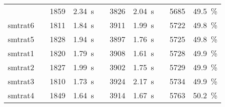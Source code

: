 \begin{table}[]
\begin{tabularx}{\textwidth}{lXrrXrrXrr}
    	&& 1859 & 2.34~s
    	&& 3826 & 2.04~s
    	&& 5685 & 49.5~\%
    	\\
    	\rowcolor{green!20}
    	smtrat6
    	&& 1811 & 1.84~s
    	&& 3911 & 1.99~s
    	&& 5722 & 49.8~\%
    	\\
    	\rowcolor{green!20}
    	smtrat5
    	&& 1828 & 1.94~s
    	&& 3897 & 1.76~s
    	&& 5725 & 49.8~\%
    	\\
    	\rowcolor{green!20}
    	smtrat1
    	&& 1820 & 1.79~s
    	&& 3908 & 1.61~s
    	&& 5728 & 49.9~\%
    	\\
     	\rowcolor{green!20}
    	smtrat2
    	&& 1827 & 1.99~s
    	&& 3902 & 1.75~s
    	&& 5729 & 49.9~\%
    	\\
    	\rowcolor{green!20}
    	smtrat3
    	&& 1810 & 1.73~s
    	&& 3924 & 2.17~s
    	&& 5734 & 49.9~\%
    	\\
     	\rowcolor{green!20}
    	smtrat4
    	&& 1849 & 1.64~s
    	&& 3914 & 1.67~s
    	&& 5763 & 50.2~\%
    	\\
    	\bottomrule
    \end{tabularx}
    \label{table:results_our_solvers}
\end{table}

